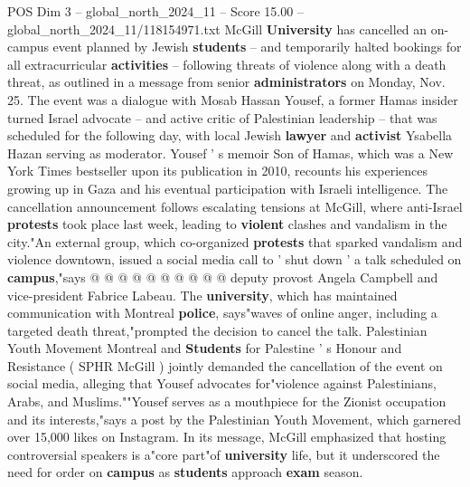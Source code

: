 \begin{textsample}{POS Dim 3 – global\_north\_2024\_11 – Score 15.00 – global\_north\_2024\_11/118154971.txt}  \label{ex:f3_pos_180}
McGill \textbf{University} has cancelled an on-campus event planned by Jewish \textbf{students} -- and temporarily halted bookings for all extracurricular \textbf{activities} -- following threats of violence along with a death threat, as outlined in a message from senior \textbf{administrators} on Monday, Nov. 25.
The event was a dialogue with Mosab Hassan Yousef, a former Hamas insider turned Israel advocate -- and active critic of Palestinian leadership -- that was scheduled for the following day, with local Jewish \textbf{lawyer} and \textbf{activist} Ysabella Hazan serving as moderator.
Yousef ' s memoir Son of Hamas, which was a New York Times bestseller upon its publication in 2010, recounts his experiences growing up in Gaza and his eventual participation with Israeli intelligence.
The cancellation announcement follows escalating tensions at McGill, where anti-Israel \textbf{protests} took place last week, leading to \textbf{violent} clashes and vandalism in the city."An external group, which co-organized \textbf{protests} that sparked vandalism and violence downtown, issued a social media call to ' shut down ' a talk scheduled on \textbf{campus},"says @ @ @ @ @ @ @ @ @ @ deputy provost Angela Campbell and vice-president Fabrice Labeau.
The \textbf{university}, which has maintained communication with Montreal \textbf{police}, says"waves of online anger, including a targeted death threat,"prompted the decision to cancel the talk.
Palestinian Youth Movement Montreal and \textbf{Students} for Palestine ' s Honour and Resistance ( SPHR McGill ) jointly demanded the cancellation of the event on social media, alleging that Yousef advocates for"violence against Palestinians, Arabs, and Muslims.""Yousef serves as a mouthpiece for the Zionist occupation and its interests,"says a post by the Palestinian Youth Movement, which garnered over 15,000 likes on Instagram.
In its message, McGill emphasized that hosting controversial speakers is a"core part"of \textbf{university} life, but it underscored the need for order on \textbf{campus} as \textbf{students} approach \textbf{exam} season.

\end{textsample}
